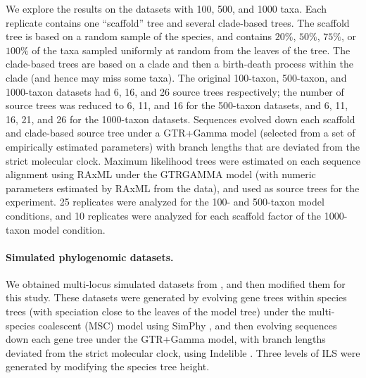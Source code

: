 We explore the results on the datasets with 100, 500, and 1000 taxa.
Each replicate contains one ``scaffold'' tree and several clade-based trees. 
The scaffold tree is based on a random sample of the species, and contains $20\%$, $50\%$, $75\%$, or $100\%$ of the taxa sampled uniformly at random from the leaves of the tree.
The clade-based trees are based on a clade and then a birth-death process within the clade (and hence may miss some taxa). The original 100-taxon, 500-taxon, and 1000-taxon datasets had 6, 16, and 26 source trees respectively; the number of source trees was reduced to 
6, 11, and 16 for the 500-taxon datasets, and 6, 11, 16, 21, and 26 for the 1000-taxon datasets. 
Sequences evolved down each scaffold and clade-based source tree under a GTR+Gamma model  (selected from a set of empirically estimated parameters) with branch lengths that are deviated from the strict molecular clock. 
Maximum likelihood trees  were estimated on each sequence alignment using RAxML under the GTRGAMMA model (with numeric parameters estimated by RAxML from the data), and used as source trees for the experiment. 
25 replicates were analyzed for the 100- and 500-taxon model conditions, and 
10 replicates were analyzed for each scaffold factor of the 1000-taxon model condition.

\paragraph{Simulated phylogenomic datasets. }
We obtained multi-locus simulated datasets 
from \cite{mirarab2015astral}, and then modified them for this study.
These datasets were generated  by evolving gene trees within species trees
(with speciation close to the leaves of the model tree)
under the multi-species coalescent (MSC) model using SimPhy \cite{mallo2016simphy}, and then 
evolving sequences down each gene tree
under the GTR+Gamma model, with branch lengths deviated from
the strict molecular clock, 
 using Indelible \cite{Fletcher2009}.   
Three levels of ILS were generated by modifying the species tree height.

